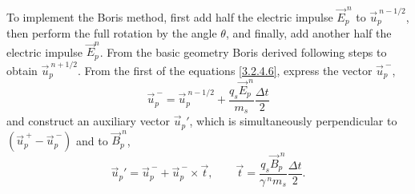 To implement the Boris method, first add half the electric impulse $ \vec{E}_{p}^{\:n} $ to $ \vec{u}_{p}^{\:n-1/2} $, then perform the full rotation by the angle $ \theta $, and finally, add another half the electric impulse $ \vec{E}_{p}^{n} $. From the basic geometry Boris derived following steps to obtain $ \vec{u}_{p}^{\:n + 1/2} $. From the first of the equations \ref{3.2.4.6}, express the vector $ \vec{u}_{p}^{\:-} $,
\begin{equation}
\vec{u}_{p}^{\:-} = \vec{u}_{p}^{\:n-1/2} +  \frac{q_{s} \vec{E}_{p}^{\:n}}{m_{s}} \frac{\Delta t}{2}
\end{equation}
and construct an auxiliary vector $ \vec{u}_{p}\!' $, which is simultaneously perpendicular to $ \left(\vec{u}_{p}^{\:+} - \vec{u}_{p}^{\:-} \right) $ and to $ \vec{B}_{p}^{\:n} $,
\begin{equation}
\vec{u}_{p}\!' = \vec{u}_{p}^{\:-} + \vec{u}_{p}^{\:-} \times \vec{t}, \qquad \vec{t} = \frac{q_{s} \vec{B}_{p}^{\:n}}{\gamma^{\:n} m_{s}} \frac{\Delta t}{2}.
\end{equation}


